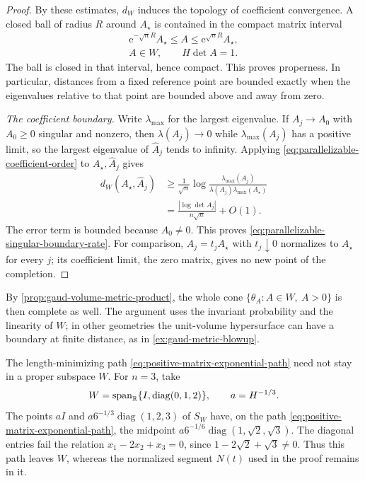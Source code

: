 \begin{proof}
By these estimates, $d_W$ induces the topology of coefficient convergence. A closed ball of radius $R$ around $A_\star$ is contained in the compact matrix interval
\[
 \begin{gathered}
 \mathrm e^{-\sqrt nR}A_\star\leq A\leq\mathrm e^{\sqrt nR}A_\star,\\
 A\in W,\qquad H\det A=1.
 \end{gathered}
\]
The ball is closed in that interval, hence compact. This proves properness. In particular, distances from a fixed reference point are bounded exactly when the eigenvalues relative to that point are bounded above and away from zero.

\emph{The coefficient boundary.}
Write $\lambda_{\max}$ for the largest eigenvalue. If $A_j\to A_0$ with $A_0\geq0$ singular and nonzero, then $\lambda(A_j)\to0$ while $\lambda_{\max}(A_j)$ has a positive limit, so the largest eigenvalue of $\widehat A_j$ tends to infinity. Applying \eqref{eq:parallelizable-coefficient-order} to $A_\star,\widehat A_j$ gives
\[
 \begin{aligned}
 d_W(A_\star,\widehat A_j)
 &\geq\frac1{\sqrt n}\log
       \frac{\lambda_{\max}(A_j)}{\lambda(A_j)\lambda_{\max}(A_\star)}\\
 &=\frac{|\log\det A_j|}{n\sqrt n}+O(1).
 \end{aligned}
\]
The error term is bounded because $A_0\ne0$. This proves \eqref{eq:parallelizable-singular-boundary-rate}. For comparison, $A_j=t_jA_\star$ with $t_j\downarrow0$ normalizes to $A_\star$ for every $j$; its coefficient limit, the zero matrix, gives no new point of the completion.
\end{proof}

By \cref{prop:gaud-volume-metric-product}, the whole cone $\{\theta_A:A\in W,\ A>0\}$ is then complete as well. The argument uses the invariant probability and the linearity of $W$; in other geometries the unit-volume hypersurface can have a boundary at finite distance, as in \cref{ex:gaud-metric-blowup}.

The length-minimizing path \eqref{eq:positive-matrix-exponential-path} need not stay in a proper subspace $W$. For $n=3$, take
\[
 W=\operatorname{span}_{\mathbb R}\{I,\operatorname{diag}(0,1,2)\},
 \qquad a=H^{-1/3}.
\]
The points $aI$ and $a6^{-1/3}\operatorname{diag}(1,2,3)$ of $S_W$ have, on the path \eqref{eq:positive-matrix-exponential-path}, the midpoint $a6^{-1/6}\operatorname{diag}(1,\sqrt2,\sqrt3)$. The diagonal entries fail the relation $x_1-2x_2+x_3=0$, since $1-2\sqrt2+\sqrt3\ne0$. Thus this path leaves $W$, whereas the normalized segment $N(t)$ used in the proof remains in it.

